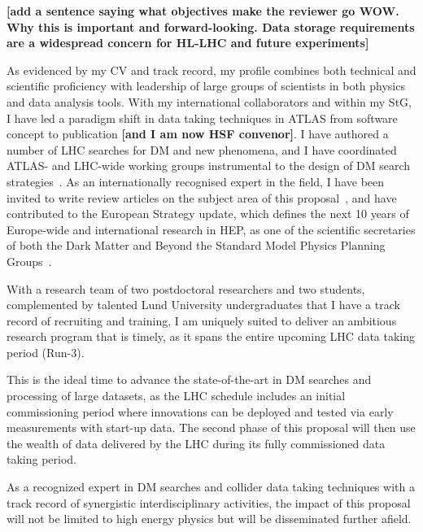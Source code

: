 \documentclass[11pt,a4paper]{article}
\begin{document}
\textbf{[add a sentence saying what objectives make the reviewer go WOW. Why this is important and forward-looking. Data storage requirements are a widespread concern for HL-LHC and future experiments]}

As evidenced by my CV and track record, my profile combines both technical and scientific proficiency with leadership of large groups of scientists in both physics and data analysis tools. 
With my international collaborators and within my StG, I have led a paradigm shift in data taking techniques in ATLAS from software concept to publication \textbf{[and I am now HSF convenor]}. I have authored a number of LHC searches for DM and new phenomena, and I have coordinated ATLAS- and LHC-wide working groups instrumental to the design of DM search strategies~\cite{DMWG}. 
As an internationally recognised expert in the field, I have been invited to write review articles on the subject area of this proposal~\cite{Buchmueller:2017qhf, Boveia:2018yeb}, and have contributed to the European Strategy update, which defines the next 10 years of Europe-wide and international research in HEP, as one of the scientific secretaries of both the Dark Matter and Beyond the Standard Model Physics Planning Groups~\cite{Strategy:2019vxc}.

With a research team of two postdoctoral researchers and two students, complemented by talented Lund University undergraduates that I have a track record of recruiting and training, I am uniquely suited to deliver an ambitious research program that is timely, as it spans the entire upcoming LHC data taking period (Run-3). 

This is the ideal time to advance the state-of-the-art in DM searches and processing of large datasets, as the LHC schedule includes an initial commissioning period where innovations can be deployed and tested via early measurements with start-up data. The  second phase of this proposal will then use the wealth of data delivered by the LHC during its fully commissioned data taking period. 


As a recognized expert in DM searches and collider data taking techniques with a track record of synergistic interdisciplinary activities, the impact of this proposal will not be limited to high energy physics but will be disseminated further afield.  

\end{document}
